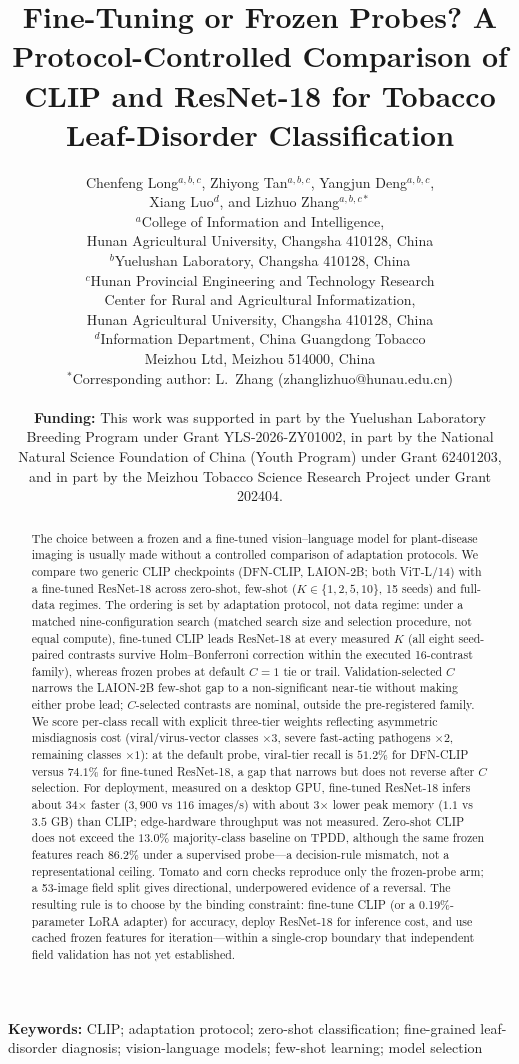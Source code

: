 \documentclass[10pt,a4paper]{article}
\title{Fine-Tuning or Frozen Probes? A Protocol-Controlled Comparison of CLIP and ResNet-18 for Tobacco Leaf-Disorder Classification}
\author{
Chenfeng Long$^{a,b,c}$, Zhiyong Tan$^{a,b,c}$, Yangjun Deng$^{a,b,c}$,\\ Xiang Luo$^{d}$, and Lizhuo Zhang$^{a,b,c*}$\\[6pt]
$^{a}$College of Information and Intelligence,\\
\hspace{1em}Hunan Agricultural University, Changsha 410128, China\\
$^{b}$Yuelushan Laboratory, Changsha 410128, China\\
$^{c}$Hunan Provincial Engineering and Technology Research\\
\hspace{1em}Center for Rural and Agricultural Informatization,\\
\hspace{1em}Hunan Agricultural University, Changsha 410128, China\\
$^{d}$Information Department, China Guangdong Tobacco\\
\hspace{1em}Meizhou Ltd, Meizhou 514000, China\\[4pt]
$^{*}$Corresponding author: L.~Zhang (zhanglizhuo@hunau.edu.cn)\\[4pt]
\parbox{\dimexpr\hsize-2\tabcolsep\relax}{\sloppy\small\textbf{Funding:} This work was supported in part by the Yuelushan Laboratory Breeding Program under Grant YLS-2026-ZY01002, in part by the National Natural Science Foundation of China (Youth Program) under Grant 62401203, and in part by the Meizhou Tobacco Science Research Project under Grant 202404.}
}
\date{}
\begin{document}
\maketitle

\begin{abstract}
The choice between a frozen and a fine-tuned vision--language model for plant-disease imaging is usually made without a controlled comparison of adaptation protocols. We compare two generic CLIP checkpoints (DFN-CLIP, LAION-2B; both ViT-L/14) with a fine-tuned ResNet-18 across zero-shot, few-shot ($K\in\{1,2,5,10\}$, 15 seeds) and full-data regimes. The ordering is set by adaptation protocol, not data regime: under a matched nine-configuration search (matched search size and selection procedure, not equal compute), fine-tuned CLIP leads ResNet-18 at every measured $K$ (all eight seed-paired contrasts survive Holm--Bonferroni correction within the executed 16-contrast family), whereas frozen probes at default $C{=}1$ tie or trail. Validation-selected $C$ narrows the LAION-2B few-shot gap to a non-significant near-tie without making either probe lead; $C$-selected contrasts are nominal, outside the pre-registered family. We score per-class recall with explicit three-tier weights reflecting asymmetric misdiagnosis cost (viral/virus-vector classes $\times3$, severe fast-acting pathogens $\times2$, remaining classes $\times1$): at the default probe, viral-tier recall is $51.2\%$ for DFN-CLIP versus $74.1\%$ for fine-tuned ResNet-18, a gap that narrows but does not reverse after $C$ selection. For deployment, measured on a desktop GPU, fine-tuned ResNet-18 infers about 34$\times$ faster ($3{,}900$ vs $116$ images/s) with about 3$\times$ lower peak memory ($1.1$ vs $3.5$ GB) than CLIP; edge-hardware throughput was not measured. Zero-shot CLIP does not exceed the $13.0\%$ majority-class baseline on TPDD, although the same frozen features reach $86.2\%$ under a supervised probe---a decision-rule mismatch, not a representational ceiling. Tomato and corn checks reproduce only the frozen-probe arm; a 53-image field split gives directional, underpowered evidence of a reversal. The resulting rule is to choose by the binding constraint: fine-tune CLIP (or a 0.19\%-parameter LoRA adapter) for accuracy, deploy ResNet-18 for inference cost, and use cached frozen features for iteration---within a single-crop boundary that independent field validation has not yet established.
\end{abstract}

\noindent\textbf{Keywords:} CLIP; adaptation protocol; zero-shot classification; fine-grained leaf-disorder diagnosis; vision-language models; few-shot learning; model selection
\end{document}
